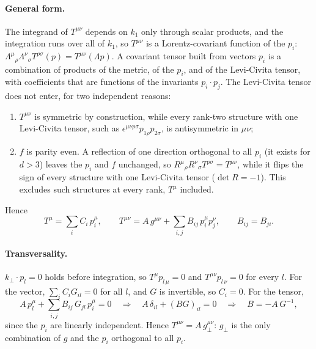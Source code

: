 \documentclass[11pt,a4paper]{article}
\newcommand{\kperp}{k_{\perp}}
\begin{document}
\paragraph{General form.} The integrand of $T^{\mu\nu}$ depends on $k_1$ only through scalar products, and the
integration runs over all of $k_1$, so $T^{\mu\nu}$ is a Lorentz-covariant function of the $p_i$:
$\Lambda^\mu{}_\rho\Lambda^\nu{}_\sigma T^{\rho\sigma}(p)=T^{\mu\nu}(\Lambda p)$. A covariant tensor built from vectors
$p_i$ is a combination of products of the metric, of the $p_i$, and of the Levi-Civita tensor, with coefficients that
are functions of the invariants $p_i\cdot p_j$. The Levi-Civita tensor does not enter, for two independent reasons:
\begin{enumerate}
\item $T^{\mu\nu}$ is symmetric by construction, while every rank-two structure with one Levi-Civita tensor, such as
$\epsilon^{\mu\nu\rho\sigma}p_{1\rho}p_{2\sigma}$, is antisymmetric in $\mu\nu$;
\item $f$ is parity even. A reflection of one direction orthogonal to all $p_i$ (it exists for $d>3$) leaves the
$p_i$ and $f$ unchanged, so $R^\mu{}_\rho R^\nu{}_\sigma T^{\rho\sigma}=T^{\mu\nu}$, while it flips the sign of every
structure with one Levi-Civita tensor ($\det R=-1$). This excludes such structures at every rank, $T^\mu$ included.
\end{enumerate}
Hence
\begin{equation}
T^\mu=\sum_iC_i\,p_i^\mu ,\qquad
T^{\mu\nu}=A\,g^{\mu\nu}+\sum_{i,j}B_{ij}\,p_i^\mu p_j^\nu ,\qquad B_{ij}=B_{ji}.
\end{equation}

\paragraph{Transversality.} $\kperp\cdot p_l=0$ holds before integration, so $T^\mu p_{l\,\mu}=0$ and
$T^{\mu\nu}p_{l\,\nu}=0$ for every $l$. For the vector, $\sum_iC_iG_{il}=0$ for all $l$, and $G$ is invertible, so
$C_i=0$. For the tensor,
\begin{equation}
A\,p_l^\mu+\sum_{i,j}B_{ij}\,G_{jl}\,p_i^\mu=0
\quad\Longrightarrow\quad A\,\delta_{il}+(BG)_{il}=0
\quad\Longrightarrow\quad B=-A\,G^{-1},
\end{equation}
since the $p_i$ are linearly independent. Hence $T^{\mu\nu}=A\,g_\perp^{\mu\nu}$: $g_\perp$ is the only combination of
$g$ and the $p_i$ orthogonal to all $p_i$.
\end{document}
